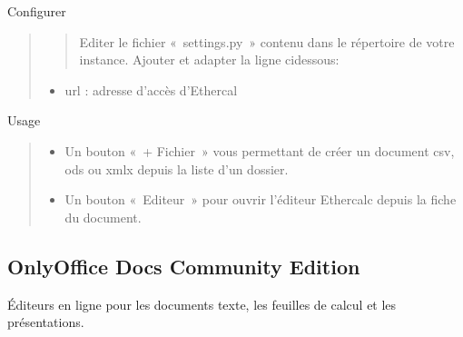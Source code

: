 \documentclass[a4paper,10pt,oneside,french]{sphinxmanual}
\begin{document}
\sphinxAtStartPar
Configurer
\begin{quote}
\begin{quote}

\sphinxAtStartPar
Editer le fichier « settings.py » contenu dans le répertoire de votre instance.
Ajouter et adapter la ligne ci\sphinxhyphen{}dessous:
\end{quote}
\begin{itemize}
\item {} 
\sphinxAtStartPar
url : adresse d’accès d’Ethercal

\end{itemize}
\end{quote}

\begin{sphinxVerbatim}[commandchars=\\\{\}]
   
\end{sphinxVerbatim}

\sphinxAtStartPar
Usage
\begin{quote}
\begin{description}
\begin{itemize}
\item {} 
\sphinxAtStartPar
Un bouton « + Fichier » vous permettant de créer un document csv, ods ou xmlx depuis la liste d’un dossier.

\item {} 
\sphinxAtStartPar
Un bouton « Editeur » pour ouvrir l’éditeur Ethercalc depuis la fiche du document.

\end{itemize}

\end{description}
\end{quote}

\noindent{}


\subsection{OnlyOffice Docs Community Edition}
\label{\detokenize{documents/editor:onlyoffice-docs-community-edition}}
\sphinxAtStartPar
Éditeurs en ligne pour les documents texte, les feuilles de calcul et les présentations.
\end{document}
